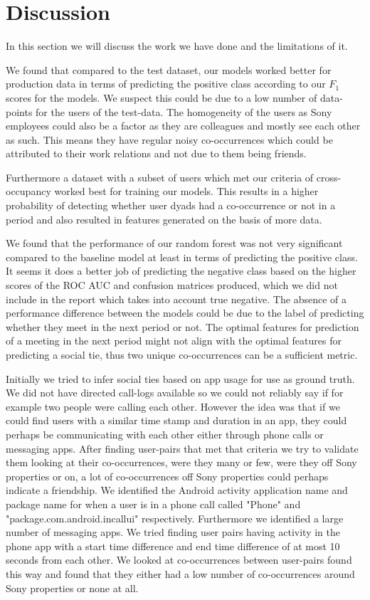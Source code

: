 \chapter{Discussion}
\label{chap:discussion}
In this section we will discuss the work we have done and the limitations of it.

We found that compared to the test dataset, our models worked better for production data in terms of predicting the positive class according to our $F_1$ scores for the models. We suspect this could be due to a low number of data-points for the users of the test-data. The homogeneity of the users as Sony employees could also be a factor as they are colleagues and mostly see each other as such. This means they have regular noisy co-occurrences which could be attributed to their work relations and not due to them being friends.

Furthermore a dataset with a subset of users which met our criteria of cross-occupancy worked best for training our models. This results in a higher probability of detecting whether user dyads had a co-occurrence or not in a period and also resulted in features generated on the basis of more data. 

We found that the performance of our random forest was not very significant compared to the baseline model at least in terms of predicting the positive class. It seems it does a better job of predicting the negative class based on the higher scores of the ROC AUC and confusion matrices produced, which we did not include in the report which takes into account true negative. The absence of a performance difference between the models could be due to the label of predicting whether they meet in the next period or not. The optimal features for prediction of a meeting in the next period might not align with the optimal features for predicting a social tie, thus two unique co-occurrences can be a sufficient metric. 

Initially we tried to infer social ties based on app usage for use as ground truth. We did not have directed call-logs available so we could not reliably say if for example two people were calling each other. However the idea was that if we could find users with a similar time stamp and duration in an app, they could perhaps be communicating with each other either through phone calls or messaging apps. After finding user-pairs that met that criteria we try to validate them looking at their co-occurrences, were they many or few, were they off Sony properties or on, a lot of co-occurrences off Sony properties could perhaps indicate a friendship. We identified the Android activity application name and package name for when a user is in a phone call called "Phone" and "package.com.android.incallui" respectively. Furthermore we identified a large number of messaging apps. We tried finding user pairs having activity in the phone app with a start time difference and end time difference of at most 10 seconds from each other. We looked at co-occurrences between user-pairs found this way and found that they either had a low number of co-occurrences around Sony properties or none at all.


